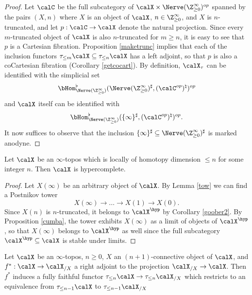 \begin{proof}
Let $\calC$ be the full subcategory of $\calX \times \Nerve(\Z_{\geq 0}^{\infty})^{op}$
spanned by the pairs $(X, n)$ where $X$ is an object of $\calX$, $n \in \Z_{\geq 0}^{\infty}$,
and $X$ is $n$-truncated, and let $p: \calC \rightarrow \calX$ denote the natural projection.
Since every $m$-truncated object of $\calX$ is also $n$-truncated for $m \geq n$, it is easy to see that $p$ is a Cartesian fibration. Proposition \ref{maketrunc} implies that each of the inclusion
functors $\tau_{\leq m} \calX \subseteq \tau_{\leq n} \calX$ has a left adjoint, so that $p$ is also a coCartesian fibration (Corollary \ref{getcocart}). By definition, $\calX_{\tau}$ can be identified
with the simplicial set
$$ \bHom^{\flat}_{\Nerve(\Z_{\geq 0}^{\infty})}( \Nerve(\Z_{\geq 0}^{\infty})^{\sharp}, 
(\calC^{op})^{\natural} )^{op}$$
and $\calX$ itself can be identified with
$$ \bHom^{\flat}_{\Nerve(\Z_{\geq 0}^{\infty})}( \{\infty\}^{\sharp}, 
(\calC^{op})^{\natural} )^{op}.$$
It now suffices to observe that the inclusion
$\{ \infty\}^{\sharp} \subseteq \Nerve(\Z_{\geq 0}^{\infty})^{\sharp}$ is marked anodyne.
\end{proof}

\begin{corollary}[Jardine]\label{fdfd}
Let $\calX$ be an $\infty$-topos which is locally of homotopy dimension $\leq n$ for some integer $n$. Then $\calX$ is hypercomplete.
\end{corollary}

\begin{proof}
Let $X(\infty)$ be an arbitrary object of $\calX$. By Lemma \ref{tow} we can find a Postnikov tower
$$ X(\infty) \rightarrow \ldots \rightarrow X(1) \rightarrow X(0).$$
Since $X(n)$ is $n$-truncated, it belongs to $\calX^{\hyp}$ by Corollary \ref{goober2}.
By Proposition \ref{cumba}, the tower exhibits $X(\infty)$ as a limit of objects
of $\calX^{\hyp}$, so that $X(\infty)$ belongs to $\calX^{\hyp}$ as well since
the full subcategory $\calX^{\hyp} \subseteq \calX$ is stable under limits.
\end{proof}

\begin{lemma}\label{nicelemma}
Let $\calX$ be an $\infty$-topos, $n \geq 0$, $X$ an
$(n+1)$-connective object of $\calX$, and $f^{\ast}: \calX \rightarrow \calX_{/X}$ a right adjoint to the projection $\calX_{/X} \rightarrow \calX$.
Then $f^{\ast}$ induces a fully faithful functor
$\tau_{\leq n} \calX \rightarrow \tau_{\leq n} \calX_{/X}$ which restricts to an equivalence from $\tau_{\leq n-1} \calX$ to $\tau_{\leq n-1} \calX_{/X}$
\end{lemma}

